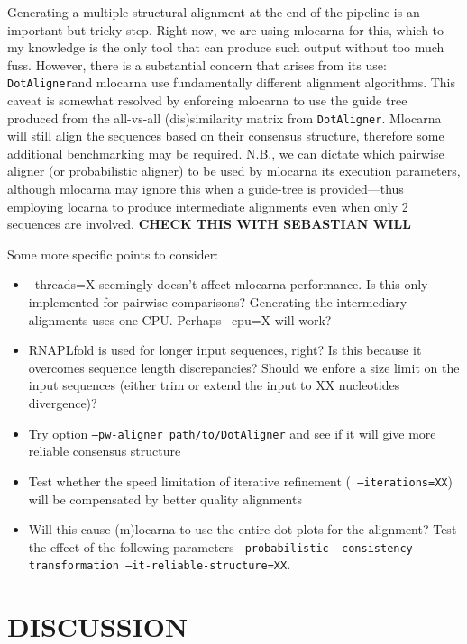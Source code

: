 \documentclass[a4paper,twoside]{article}
\newcommand\dotaligner{\texttt{DotAligner}}
\begin{document}
Generating a multiple structural alignment at the end of the pipeline is an
important but tricky step.  Right now, we are using mlocarna for this, which to
my knowledge is the only tool that can produce such output without too much
fuss. However, there is a substantial concern that arises from its use:
\dotaligner and mlocarna use fundamentally different alignment algorithms. This
caveat is somewhat resolved by enforcing mlocarna to use the guide tree
produced from the all-vs-all (dis)similarity matrix from \dotaligner . Mlocarna
will still align the sequences based on their consensus structure, therefore
some additional benchmarking may be required. N.B., we can dictate which
pairwise aligner (or probabilistic aligner) to be used by mlocarna its
execution parameters, although mlocarna may ignore this when a guide-tree is
provided---thus employing locarna to produce intermediate alignments even when
only 2 sequences are involved. \textbf{CHECK THIS WITH SEBASTIAN WILL }

Some more specific points to consider: 
\begin{itemize}
\item --threads=X seemingly doesn't affect mlocarna performance. Is this only implemented for pairwise comparisons? 
Generating the intermediary alignments uses one CPU. Perhaps --cpu=X will work? 
\item RNAPLfold is used for longer input sequences, right? Is this because it overcomes sequence length discrepancies? 
Should we enfore a size limit on the input sequences (either trim or extend the input to XX nucleotides divergence)?
\item Try option \texttt{--pw-aligner path/to/DotAligner} and see if it will give more reliable consensus structure
\item Test whether the speed limitation of iterative refinement (\texttt{ --iterations=XX}) will be compensated by 
better quality alignments
\item Will this cause (m)locarna to use the entire dot plots for the alignment? Test the effect of the following 
parameters \texttt{--probabilistic --consistency-transformation --it-reliable-structure=XX}. 
\end{itemize} 


\section{\uppercase{Discussion}}
\end{document}
